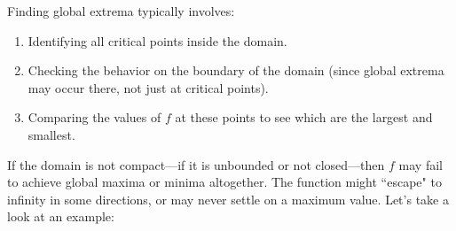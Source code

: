 \noindent Finding global extrema typically involves:
\begin{enumerate}
    \item Identifying all critical points inside the domain.
    \item Checking the behavior on the boundary of the domain (since global extrema may occur there, not just at critical points).
    \item Comparing the values of \( f \) at these points to see which are the largest and smallest.
\end{enumerate}

\noindent If the domain is not compact—if it is unbounded or not closed—then \( f \) may fail to achieve global maxima or minima altogether. The function might ``escape" to infinity in some directions, or may never settle on a maximum value. Let's take a look at an example:


